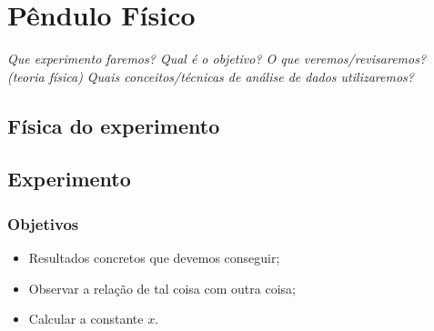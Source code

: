 \chapter{Pêndulo Físico} %
\label{Chap:PenduloFisico} %

\begin{fullwidth}\it
	Que experimento faremos?
	Qual é o objetivo?
	O que veremos/revisaremos? (teoria física)
	Quais conceitos/técnicas de análise de dados utilizaremos?
\end{fullwidth}

\section{Física do experimento}


\section{Experimento}

\subsection{Objetivos}

\begin{itemize}
	\item Resultados concretos que devemos conseguir;
	\item Observar a relação de tal coisa com outra coisa;
	\item Calcular a constante $x$.
\end{itemize}


